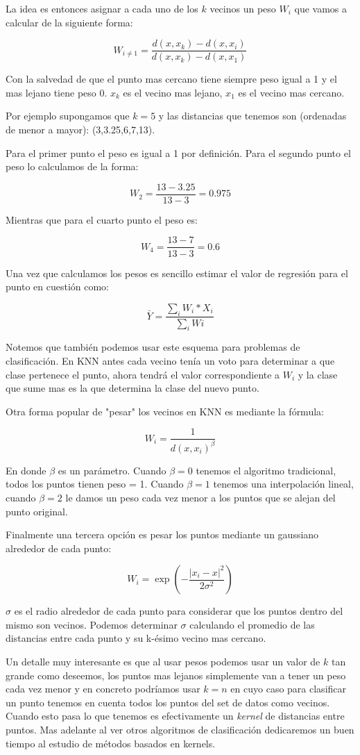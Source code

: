 La idea es entonces asignar a cada uno de los $k$ vecinos un peso $W_i$ que vamos a calcular de la siguiente forma:

$$W_{i \ne 1} = \frac{d(x,x_k) - d(x,x_i)}{d(x,x_k)-d(x,x_1)}$$

Con la salvedad de que el punto mas cercano tiene siempre peso igual a 1 y el mas lejano tiene peso 0. $x_k$ es el vecino mas lejano, $x_1$ es el vecino mas cercano.

Por ejemplo supongamos que $k=5$ y las distancias que tenemos son (ordenadas de menor a mayor): (3,3.25,6,7,13).

Para el primer punto el peso es igual a 1 por definición. Para el segundo punto el peso lo calculamos de la forma:

$$W_2 = \frac{13-3.25}{13-3} =0.975$$

Mientras que para el cuarto punto el peso es:

$$W_4 = \frac{13-7}{13-3} = 0.6$$

Una vez que calculamos los pesos es sencillo estimar el valor de regresión para el punto en cuestión como:

$$\bar{Y} = \frac{\sum_i W_i * X_i}{\sum_i Wi}$$

Notemos que también podemos usar este esquema para problemas de clasificación. En KNN antes cada vecino tenía un voto para determinar a que clase pertenece el punto, ahora tendrá el valor correspondiente a $W_i$ y la clase que sume mas es la que determina la clase del nuevo punto.

Otra forma popular de "pesar" los vecinos en KNN es mediante la fórmula:

$$W_i = \frac{1}{d(x,x_i)^\beta}$$

En donde $\beta$ es un parámetro. Cuando $\beta=0$ tenemos el algoritmo tradicional, todos los puntos tienen peso = 1. Cuando $\beta=1$ tenemos una interpolación lineal, cuando $\beta=2$ le damos un peso cada vez menor a los puntos que se alejan del punto original.

Finalmente una tercera opción es pesar los puntos mediante un gaussiano alrededor de cada punto:

$$W_i = \exp(-\frac{|x_i-x|^2}{2\sigma^2})$$

$\sigma$ es el radio alrededor de cada punto para considerar que los puntos dentro del mismo son vecinos. Podemos determinar $\sigma$ calculando el promedio de las distancias entre cada punto y su k-ésimo vecino mas cercano.

Un detalle muy interesante es que al usar pesos podemos usar un valor de $k$ tan grande como deseemos, los puntos mas lejanos simplemente van a tener un peso cada vez menor y en concreto podríamos usar $k=n$ en cuyo caso para clasificar un punto tenemos en cuenta todos los puntos del set de datos como vecinos. Cuando esto pasa lo que tenemos es efectivamente un \textit{kernel} de distancias entre puntos. Mas adelante al ver otros algoritmos de clasificación dedicaremos un buen tiempo al estudio de métodos basados en kernels.


